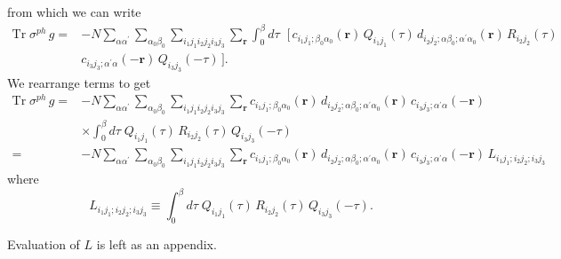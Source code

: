 from which we can write
\begin{equation}
\begin{split}
\mathrm{Tr}\;\sigma^{ph}\,g = & -
N \sum_{\alpha\alpha^{\prime}} \sum_{\alpha_0\beta_0}
\sum_{i_1 j_1 i_2 j_2 i_3 j_3}
\sum_{\mathbf{r}} \int_0^{\beta} d\tau\;
\; \big[\,c_{i_1 j_1; \beta_0 \alpha_0}(\mathbf{r})\,Q_{i_1 j_1}(\tau)\,
d_{i_2 j_2; \alpha \beta_0; \alpha^{\prime}\alpha_0}(\mathbf{r})\,
R_{i_2 j_2}(\tau)\\
& c_{i_3 j_3; \alpha^{\prime}\alpha}(-\mathbf{r})\,
Q_{i_3 j_3}(-\tau)\,\big].
\end{split}
\end{equation}
We rearrange terms to get
\begin{equation}
\begin{split}
\mathrm{Tr}\;\sigma^{ph}\,g = & -
N \sum_{\alpha\alpha^{\prime}} \sum_{\alpha_0\beta_0}
\sum_{i_1 j_1 i_2 j_2 i_3 j_3}
\sum_{\mathbf{r}} 
c_{i_1 j_1; \beta_0 \alpha_0}(\mathbf{r})\,
d_{i_2 j_2; \alpha \beta_0; \alpha^{\prime}\alpha_0}(\mathbf{r})\,
c_{i_3 j_3; \alpha^{\prime}\alpha}(-\mathbf{r}) \\
& \times
\int_0^{\beta} d\tau\;
Q_{i_1 j_1}(\tau)\,
R_{i_2 j_2}(\tau)\,
Q_{i_3 j_3}(-\tau) \\
= &- N \sum_{\alpha\alpha^{\prime}} \sum_{\alpha_0\beta_0}
\sum_{i_1 j_1 i_2 j_2 i_3 j_3}
\sum_{\mathbf{r}} 
c_{i_1 j_1; \beta_0 \alpha_0}(\mathbf{r})\,
d_{i_2 j_2; \alpha \beta_0;\alpha^{\prime}\alpha_0}(\mathbf{r})\,
c_{i_3 j_3; \alpha^{\prime}\alpha}(-\mathbf{r})
\, L_{i_1 j_1; i_2 j_2; i_3 j_3}
\end{split}
\end{equation}
where
\begin{equation}
L_{i_1 j_1; i_2 j_2; i_3 j_3} \equiv \int_0^{\beta} d\tau\;
Q_{i_1 j_1}(\tau)\,
R_{i_2 j_2}(\tau)\,
Q_{i_3 j_3}(-\tau).
\end{equation}

Evaluation of $L$ is left as an appendix.
